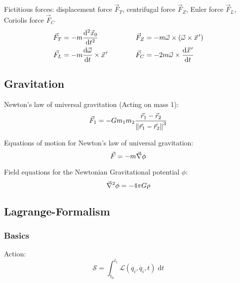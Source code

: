 		\noindent
		Fictitious forces: displacement force $\vec{F}_T$, centrifugal force $\vec{F}_Z$, Euler force $\vec{F}_L$, Coriolis force $\vec{F}_C$
		\begin{equation}
			\begin{aligned}
				\vec{F}_T &= -m\dv[2]{\vec{x}_0}{t} &\hspace{30pt}
				\vec{F}_Z &= -m\vec{\omega}\times\qty(\vec{\omega}\times\pvec{x}') \\
				\vec{F}_L &= -m\dv{\vec{\omega}}{t}\times\pvec{x}' &\hspace{30pt}
				\vec{F}_C &= -2m\vec{\omega}\times\dv{\pvec{x}'}{t} \\
			\end{aligned}
		\end{equation}


	\subsection{Gravitation}
		\noindent
		Newton's law of universal gravitation (Acting on mass 1):
		\begin{equation}
			\vec{F}_1 = - G m_1 m_2 \frac{\vec{r}_1-\vec{r}_2}{\norm{\vec{r}_1-\vec{r}_2}^3}
		\end{equation}

		\noindent
		Equations of motion for Newton's law of universal gravitation:
		\begin{equation}
			\vec{F}=-m\vec{\nabla}\phi
		\end{equation}

		\noindent
		Field equations for the Newtonian Gravitational potential $\phi$:
		\begin{equation}
			\vec{\nabla}^2\phi=-4\pi G\rho
		\end{equation}

	\subsection{Lagrange-Formalism}
		\subsubsection{Basics}
			\noindent
			Action:
			\begin{equation}
				\mathcal{S}=\int_{t_0}^{t_1}\mathcal{L}(q_i, \dot{q_i},t)\;\mathrm{d} t
			\end{equation}

